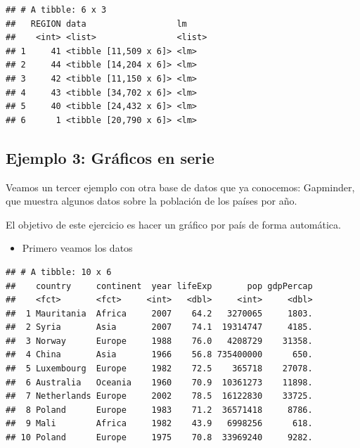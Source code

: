 \documentclass[]{book}
\newenvironment{Shaded}{\begin{snugshade}}{\end{snugshade}}
\newcommand{\DecValTok}[1]{\textcolor[rgb]{0.00,0.00,0.81}{#1}}
\newcommand{\KeywordTok}[1]{\textcolor[rgb]{0.13,0.29,0.53}{\textbf{#1}}}
\newcommand{\NormalTok}[1]{#1}
\newcommand{\OperatorTok}[1]{\textcolor[rgb]{0.81,0.36,0.00}{\textbf{#1}}}
\newcommand{\StringTok}[1]{\textcolor[rgb]{0.31,0.60,0.02}{#1}}
\providecommand{\tightlist}{%
  \setlength{\itemsep}{0pt}\setlength{\parskip}{0pt}}
\begin{document}
\begin{verbatim}
## # A tibble: 6 x 3
##   REGION data                  lm    
##    <int> <list>                <list>
## 1     41 <tibble [11,509 x 6]> <lm>  
## 2     44 <tibble [14,204 x 6]> <lm>  
## 3     42 <tibble [11,150 x 6]> <lm>  
## 4     43 <tibble [34,702 x 6]> <lm>  
## 5     40 <tibble [24,432 x 6]> <lm>  
## 6      1 <tibble [20,790 x 6]> <lm>
\end{verbatim}

\hypertarget{ejemplo-3-graficos-en-serie}{%
\subsection{Ejemplo 3: Gráficos en serie}\label{ejemplo-3-graficos-en-serie}}

Veamos un tercer ejemplo con otra base de datos que ya conocemos: Gapminder, que muestra algunos datos sobre la población de los países por año.

El objetivo de este ejercicio es hacer un gráfico por país de forma automática.

\begin{itemize}
\tightlist
\item
  Primero veamos los datos
\end{itemize}

\begin{Shaded}
\end{Shaded}

\begin{verbatim}
## # A tibble: 10 x 6
##    country     continent  year lifeExp       pop gdpPercap
##    <fct>       <fct>     <int>   <dbl>     <int>     <dbl>
##  1 Mauritania  Africa     2007    64.2   3270065     1803.
##  2 Syria       Asia       2007    74.1  19314747     4185.
##  3 Norway      Europe     1988    76.0   4208729    31358.
##  4 China       Asia       1966    56.8 735400000      650.
##  5 Luxembourg  Europe     1982    72.5    365718    27078.
##  6 Australia   Oceania    1960    70.9  10361273    11898.
##  7 Netherlands Europe     2002    78.5  16122830    33725.
##  8 Poland      Europe     1983    71.2  36571418     8786.
##  9 Mali        Africa     1982    43.9   6998256      618.
## 10 Poland      Europe     1975    70.8  33969240     9282.
\end{verbatim}
\end{document}
